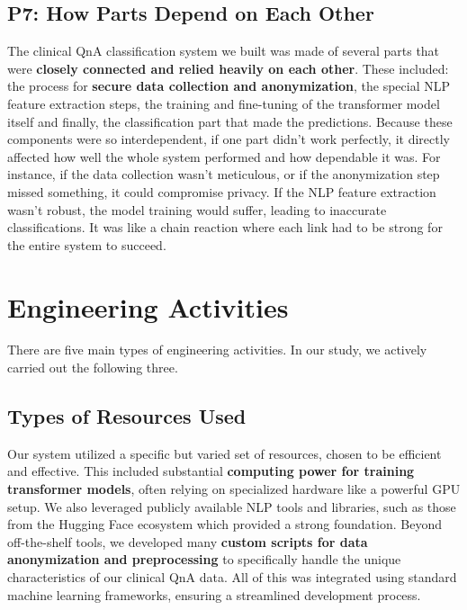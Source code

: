 \subsection{P7: How Parts Depend on Each Other}
The clinical QnA classification system we built was made of several parts that were \textbf{closely connected and relied heavily on each other}. These included: the process for \textbf{secure data collection and anonymization}, the special NLP feature extraction steps, the training and fine-tuning of the transformer model itself and finally, the classification part that made the predictions. Because these components were so interdependent, if one part didn't work perfectly, it directly affected how well the whole system performed and how dependable it was. For instance, if the data collection wasn't meticulous, or if the anonymization step missed something, it could compromise privacy. If the NLP feature extraction wasn't robust, the model training would suffer, leading to inaccurate classifications. It was like a chain reaction where each link had to be strong for the entire system to succeed.

\clearpage

\section{Engineering Activities}
There are five main types of engineering activities. In our study, we actively carried out the following three.

\subsection{Types of Resources Used}
Our system utilized a specific but varied set of resources, chosen to be efficient and effective. This included substantial \textbf{computing power for training transformer models}, often relying on specialized hardware like a powerful GPU setup. We also leveraged publicly available NLP tools and libraries, such as those from the Hugging Face ecosystem which provided a strong foundation. Beyond off-the-shelf tools, we developed many \textbf{custom scripts for data anonymization and preprocessing} to specifically handle the unique characteristics of our clinical QnA data. All of this was integrated using standard machine learning frameworks, ensuring a streamlined development process.

